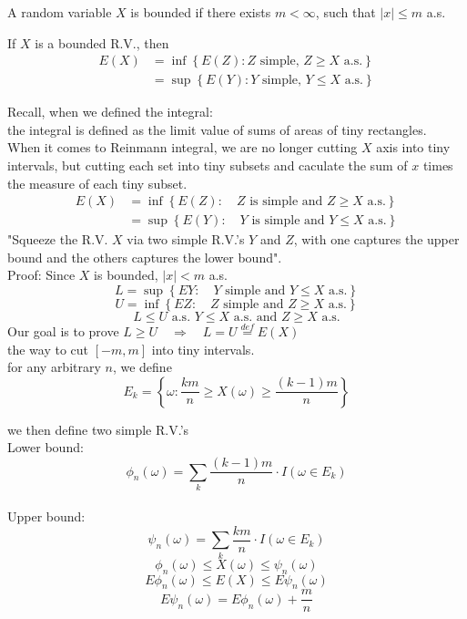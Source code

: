\begin{definition}
    A random variable $X$ is bounded if there exists
    $m< \infty$, such that $|x|\leq m$ a.s.
\end{definition}

\begin{definition}
    If $X$ is a bounded R.V., then
    \begin{align*}
        E(X) &= \inf\left\{ E(Z): Z \text{ simple, }Z \geq X \text{ a.s.}\right\}\\
        &= \sup\left\{E(Y): Y \text{ simple, }Y \leq X \text{ a.s.}\right\}
    \end{align*}
\end{definition}

Recall, when we defined the integral:
\\the integral is defined as the limit value of sums of areas of tiny rectangles.
\\When it comes to Reinmann integral, we are no longer cutting $X$ axis into tiny intervals, but cutting each set into tiny subsets and caculate the sum of $x$ times the measure of each tiny subset.
\begin{align*}
    E(X) &= \inf \left\{E(Z): \quad Z\text{ is simple and } Z \geq X \text{ a.s.}\right\}\\
    &= \sup \left\{E(Y): \quad Y \text{ is simple and } Y \leq X \text{ a.s.}\right\}
\end{align*}
"Squeeze the R.V. $X$ via two simple R.V.'s $Y$ and $Z$, with one captures the upper bound and the others captures the lower bound".
\\Proof: Since $X$ is bounded, $|x| < m$ a.s.
\[L = \sup \left\{EY: \quad Y \text{ simple and }Y\leq X \text{ a.s.}\right\}\]
\[U = \inf\left\{EZ: \quad Z \text{ simple and }Z \geq X \text{ a.s.}\right\}\]
\[L \leq U \text{ a.s. } Y\leq X \text{ a.s. and }Z\geq X \text{ a.s.}\]
Our goal is to prove $L \geq U \quad \Rightarrow \quad L = U \overset{def}{=}E(X)$
\\the way to cut $[-m, m]$ into tiny intervals.
\\for any arbitrary $n$, we define
\[E_k = \left\{\omega: \frac{km}{n}\geq X(\omega) \geq \frac{(k-1)m}{n}\right\}\]

we then define two simple R.V.'s
\\Lower bound: \[\phi_n(\omega) = \sum_{k}^{}\frac{(k-1)m}{n}\cdot I(\omega \in E_k)\]
\\Upper bound: \[\psi_n(\omega) = \sum_{k}^{}\frac{km}{n}\cdot I(\omega \in E_k) \]
\[\phi_n(\omega) \leq X(\omega) \leq \psi_n(\omega)\]
\[E\phi_n(\omega) \leq E(X) \leq E\psi_n(\omega)\]
\[E\psi_n(\omega) = E\phi_n(\omega) + \frac{m}{n}\]


